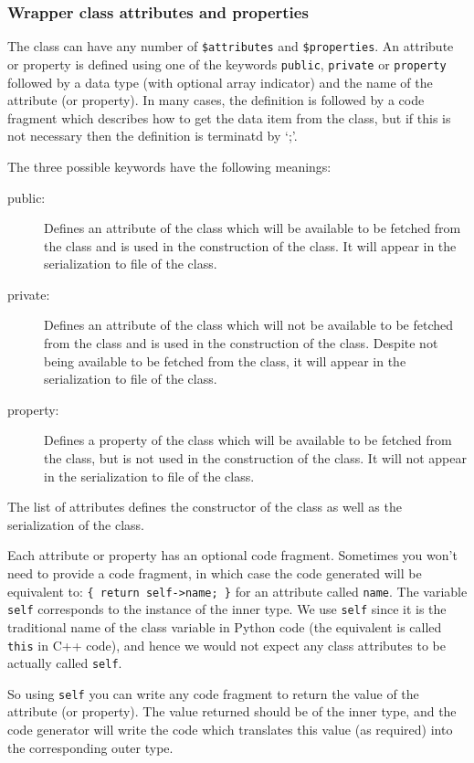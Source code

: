 \subsubsection*{Wrapper class attributes and properties}

The class can have any number of \texttt{\$attributes} and \texttt{\$properties}.
An attribute or property is defined using one of the keywords \texttt{public}, \texttt{private} or \texttt{property} followed by a data type (with optional array indicator) and the name of the attribute (or property).
In many cases, the definition is followed by a code fragment which describes how to get the data item from the class, but if this is not necessary then the definition is terminatd by `;'.

The three possible keywords have the following meanings:

\begin{description}
\item[public:] Defines an attribute of the class which will be available to be fetched from the class and is used in the construction of the class.
It will appear in the serialization to file of the class.
\item[private:] Defines an attribute of the class which will not be available to be fetched from the class and is used in the construction of the class.
Despite not being available to be fetched from the class, it will appear in the serialization to file of the class.
\item[property:] Defines a property of the class which will be available to be fetched from the class, but is not used in the construction of the class.
It will not appear in the serialization to file of the class.
\end{description}

The list of attributes defines the constructor of the class as well as the serialization of the class.

Each attribute or property has an optional code fragment.
Sometimes you won't need to provide a code fragment, in which case the code generated will be equivalent to:
\verb|{ return self->name; }| for an attribute called \texttt{name}.
The variable \texttt{self} corresponds to the instance of the inner type.
We use \texttt{self} since it is the traditional name of the class variable in Python code (the equivalent is called \texttt{this} in C++ code), and hence we would not expect any class attributes to be actually called \texttt{self}.

So using \texttt{self} you can write any code fragment to return the value of the attribute (or property).
The value returned should be of the inner type, and the code generator will write the code which translates this value (as required) into the corresponding outer type.

